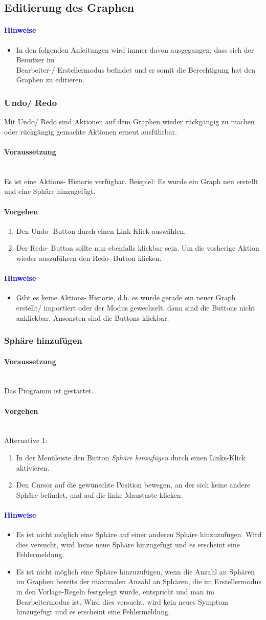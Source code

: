 \documentclass[enabledeprecatedfontcommands,fontsize=11pt,paper=a4,twoside]{scrartcl}
\newcounter{one}
\newcommand*{\hint}{\paragraph{\textcolor{blue}{Hinweise}}}
\newcommand*{\condition}{\paragraph{Voraussetzung}$\;$ \vspace{0.2cm}\\}
\newcommand*{\actions}{\paragraph{Vorgehen} $\;$\vspace{0.2cm}\\}
\newcommand*{\action}{\paragraph{Vorgehen}}
\begin{document}
	\subsection{Editierung des Graphen}\label{edit}
		\hint
		\begin{itemize}
			\item In den folgenden Anleitungen wird immer davon ausgegangen, dass sich der Benutzer im \\
			Bearbeiter-/ Erstellermodus befindet und er somit die Berechtigung hat den Graphen zu editieren.
		\end{itemize}
		\subsubsection{Undo/ Redo}
		Mit Undo/ Redo sind Aktionen auf dem Graphen wieder rückgängig zu machen oder rückgängig gemachte Aktionen erneut ausführbar. 
		\condition
		Es ist eine Aktions- Historie verfügbar. Beispiel: Es wurde ein Graph neu erstellt und eine Sphäre hinzugefügt. 	
		\action
		\begin{enumerate}
			\item Den Undo- Button durch einen Link-Klick auswählen. 
			\item Der Redo- Button sollte nun ebenfalls klickbar sein. Um die vorherige Aktion wieder auszuführen den Redo- Button klicken. 
		\end{enumerate}			
		\hint
		\begin{itemize}
			\item Gibt es keine Aktions- Historie, d.h. es wurde gerade ein neuer Graph erstellt/ importiert oder der Modus gewechselt, dann sind die Buttons nicht anklickbar. Ansonsten sind die Buttons klickbar.
		\end{itemize}
		\subsubsection{Sphäre hinzufügen}	
		\condition 	
		Das Programm ist gestartet.
		\actions
		Alternative 1: 
		\begin{enumerate}
			\item In der Menüleiste den Button \textit{Sphäre hinzufügen} durch einen Links-Klick aktivieren.
			\item Den Cursor auf die gewünschte Position bewegen, an der sich keine andere Sphäre befindet, und auf die linke Maustaste klicken.
		\end{enumerate}
		\hint
		\begin{itemize}
			\item Es ist nicht möglich eine Sphäre auf einer anderen Sphäre hinzuzufügen. Wird dies versucht, wird keine neue Sphäre hinzugefügt und es erscheint eine Fehlermeldung.
	\item Es ist nicht möglich eine Sphäre hinzuzufügen, wenn die Anzahl an Sphären im Graphen bereits der maximalen Anzahl an Sphären, die im Erstellermodus in den Vorlage-Regeln festgelegt wurde, entspricht und man im Bearbeitermodus ist. Wird dies versucht, wird kein neues Symptom hinzugefügt und es erscheint eine Fehlermeldung.
	\end{itemize}
\end{document}
